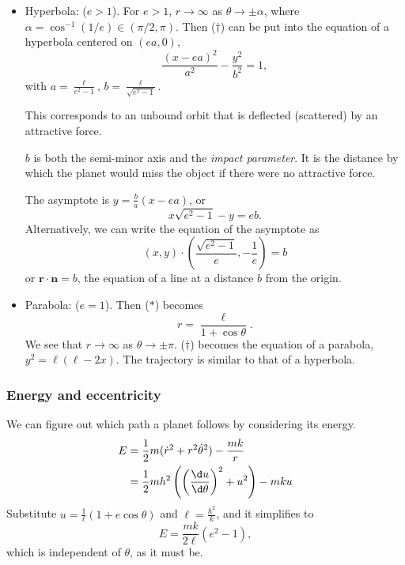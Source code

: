 \documentclass[a4paper]{article}
\begin{document}
\begin{itemize}
  \item Hyperbola: ($e > 1$). For $e > 1$, $r\to \infty$ as $\theta \to \pm \alpha$, where $\alpha = \cos^{-1}(1/e)\in (\pi/2, \pi)$. Then ($\dagger$) can be put into the equation of a hyperbola centered on $(ea, 0)$,
    \[
      \frac{(x - ea)^2}{a^2} - \frac{y^2}{b^2} = 1,
    \]
    with $\displaystyle a = \frac{\ell}{e^2 - 1}$, $\displaystyle b = \frac{\ell}{\sqrt{e^2 - 1}}$.
    \begin{center}
    \end{center}
    This corresponds to an unbound orbit that is deflected (scattered) by an attractive force.

    $b$ is both the semi-minor axis and the \emph{impact parameter}. It is the distance by which the planet would miss the object if there were no attractive force.

    The asymptote is $y = \frac{b}{a}(x - ea)$, or
    \[
      x \sqrt{e^2 - 1} - y = eb.
    \]
    Alternatively, we can write the equation of the asymptote as
    \[
      (x, y) \cdot \left(\frac{\sqrt{e^2 - 1}}{e}, -\frac{1}{e}\right) = b
    \]
    or $\mathbf{r} \cdot \mathbf{n} = b$, the equation of a line at a distance $b$ from the origin.

  \item Parabola: ($e = 1$). Then ($*$) becomes
    \[
      r = \frac{\ell}{1 + \cos \theta}.
    \]
    We see that $r\to \infty$ as $\theta \to \pm \pi$. ($\dagger$) becomes the equation of a parabola, $y^2 = \ell(\ell - 2x)$. The trajectory is similar to that of a hyperbola.
\end{itemize}

\subsubsection*{Energy and eccentricity}
We can figure out which path a planet follows by considering its energy.
\begin{align*}
  E &= \frac{1}{2}m(\dot{r}^2 + r^2\dot{\theta}^2) - \frac{mk}{r}\\
  &= \frac{1}{2}mh^2\left(\left(\frac{\d u}{\d \theta}\right)^2 + u^2\right) - mku
\end{align*}
Substitute $\displaystyle u = \frac{1}{\ell}(1 + e\cos \theta)$ and $\displaystyle \ell = \frac{h^2}{k}$, and it simplifies to
\[
  E = \frac{mk}{2\ell}(e^2 - 1),
\]
which is independent of $\theta$, as it must be.
\end{document}
